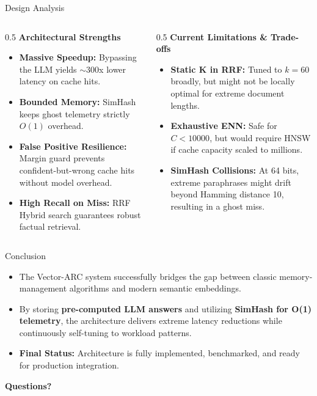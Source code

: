 \documentclass[aspectratio=169]{beamer}
\begin{document}
\begin{frame}{Design Analysis}
    \begin{columns}
        \begin{column}{0.5\textwidth}
            \textbf{Architectural Strengths}
            \begin{itemize}
                \item \textbf{Massive Speedup:} Bypassing the LLM yields $\sim$300x lower latency on cache hits.
                \item \textbf{Bounded Memory:} SimHash keeps ghost telemetry strictly $O(1)$ overhead.
                \item \textbf{False Positive Resilience:} Margin guard prevents confident-but-wrong cache hits without model overhead.
                \item \textbf{High Recall on Miss:} RRF Hybrid search guarantees robust factual retrieval.
            \end{itemize}
        \end{column}
        \begin{column}{0.5\textwidth}
            \textbf{Current Limitations \& Trade-offs}
            \begin{itemize}
                \item \textbf{Static K in RRF:} Tuned to $k=60$ broadly, but might not be locally optimal for extreme document lengths.
                \item \textbf{Exhaustive ENN:} Safe for $C < 10000$, but would require HNSW if cache capacity scaled to millions.
                \item \textbf{SimHash Collisions:} At 64 bits, extreme paraphrases might drift beyond Hamming distance 10, resulting in a ghost miss.
            \end{itemize}
        \end{column}
    \end{columns}
\end{frame}

\begin{frame}{Conclusion}
    \begin{itemize}
        \item The Vector-ARC system successfully bridges the gap between classic memory-management algorithms and modern semantic embeddings.
        \item By storing \textbf{pre-computed LLM answers} and utilizing \textbf{SimHash for O(1) telemetry}, the architecture delivers extreme latency reductions while continuously self-tuning to workload patterns.
        \item \textbf{Final Status:} Architecture is fully implemented, benchmarked, and ready for production integration.
    \end{itemize}
    
    \vspace{1cm}
    \begin{center}
        \Large \textbf{Questions?}
    \end{center}
\end{frame}
\end{document}
